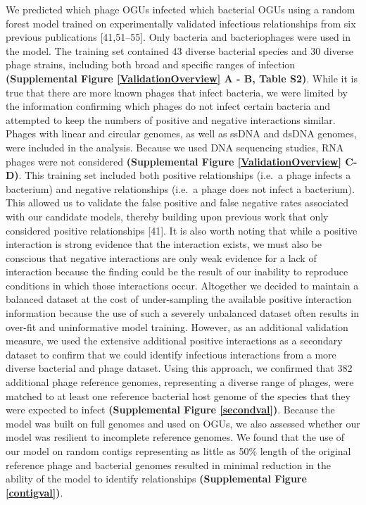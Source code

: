\documentclass[12pt,]{article}
\begin{document}
We predicted which phage OGUs infected which bacterial OGUs using a
random forest model trained on experimentally validated infectious
relationships from six previous publications {[}41,51--55{]}. Only
bacteria and bacteriophages were used in the model. The training set
contained 43 diverse bacterial species and 30 diverse phage strains,
including both broad and specific ranges of infection
\textbf{(Supplemental Figure \ref{ValidationOverview} A - B, Table S2)}.
While it is true that there are more known phages that infect bacteria,
we were limited by the information confirming which phages do not infect
certain bacteria and attempted to keep the numbers of positive and
negative interactions similar. Phages with linear and circular genomes,
as well as ssDNA and dsDNA genomes, were included in the analysis.
Because we used DNA sequencing studies, RNA phages were not considered
\textbf{(Supplemental Figure \ref{ValidationOverview} C-D)}. This
training set included both positive relationships (i.e.~a phage infects
a bacterium) and negative relationships (i.e.~a phage does not infect a
bacterium). This allowed us to validate the false positive and false
negative rates associated with our candidate models, thereby building
upon previous work that only considered positive relationships {[}41{]}.
It is also worth noting that while a positive interaction is strong
evidence that the interaction exists, we must also be conscious that
negative interactions are only weak evidence for a lack of interaction
because the finding could be the result of our inability to reproduce
conditions in which those interactions occur. Altogether we decided to
maintain a balanced dataset at the cost of under-sampling the available
positive interaction information because the use of such a severely
unbalanced dataset often results in over-fit and uninformative model
training. However, as an additional validation measure, we used the
extensive additional positive interactions as a secondary dataset to
confirm that we could identify infectious interactions from a more
diverse bacterial and phage dataset. Using this approach, we confirmed
that 382 additional phage reference genomes, representing a diverse
range of phages, were matched to at least one reference bacterial host
genome of the species that they were expected to infect
\textbf{(Supplemental Figure \ref{secondval})}. Because the model was
built on full genomes and used on OGUs, we also assessed whether our
model was resilient to incomplete reference genomes. We found that the
use of our model on random contigs representing as little as 50\% length
of the original reference phage and bacterial genomes resulted in
minimal reduction in the ability of the model to identify relationships
\textbf{(Supplemental Figure \ref{contigval})}.
\end{document}
